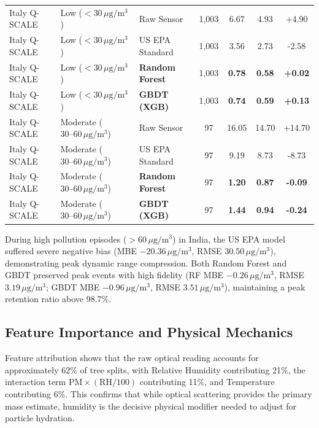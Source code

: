 \documentclass[11pt,a4paper]{article}
\begin{document}
\begin{table}[htbp]
\begin{tabularx}{\textwidth}{l l l c c c c}
\midrule
Italy Q-SCALE & Low ($<30\,\mu\text{g}/\text{m}^3$) & Raw Sensor & 1,003 & 6.67 & 4.93 & +4.90 \\
Italy Q-SCALE & Low ($<30\,\mu\text{g}/\text{m}^3$) & US EPA Standard & 1,003 & 3.56 & 2.73 & -2.58 \\
Italy Q-SCALE & Low ($<30\,\mu\text{g}/\text{m}^3$) & \textbf{Random Forest} & 1,003 & \textbf{0.78} & \textbf{0.58} & \textbf{+0.02} \\
Italy Q-SCALE & Low ($<30\,\mu\text{g}/\text{m}^3$) & \textbf{GBDT (XGB)} & 1,003 & \textbf{0.74} & \textbf{0.59} & \textbf{+0.13} \\
\midrule
Italy Q-SCALE & Moderate ($30\text{--}60\,\mu\text{g}/\text{m}^3$) & Raw Sensor & 97 & 16.05 & 14.70 & +14.70 \\
Italy Q-SCALE & Moderate ($30\text{--}60\,\mu\text{g}/\text{m}^3$) & US EPA Standard & 97 & 9.19 & 8.73 & -8.73 \\
Italy Q-SCALE & Moderate ($30\text{--}60\,\mu\text{g}/\text{m}^3$) & \textbf{Random Forest} & 97 & \textbf{1.20} & \textbf{0.87} & \textbf{-0.09} \\
Italy Q-SCALE & Moderate ($30\text{--}60\,\mu\text{g}/\text{m}^3$) & \textbf{GBDT (XGB)} & 97 & \textbf{1.44} & \textbf{0.94} & \textbf{-0.24} \\
\bottomrule
\end{tabularx}
\end{table}

During high pollution episodes ($>60\,\mu\text{g}/\text{m}^3$) in India, the US EPA model suffered severe negative bias (MBE $-20.36\,\mu\text{g}/\text{m}^3$, RMSE $30.50\,\mu\text{g}/\text{m}^3$), demonstrating peak dynamic range compression. Both Random Forest and GBDT preserved peak events with high fidelity (RF MBE $-0.26\,\mu\text{g}/\text{m}^3$, RMSE $3.19\,\mu\text{g}/\text{m}^3$; GBDT MBE $-0.96\,\mu\text{g}/\text{m}^3$, RMSE $3.51\,\mu\text{g}/\text{m}^3$), maintaining a peak retention ratio above 98.7\%.

\subsection{Feature Importance and Physical Mechanics}
Feature attribution shows that the raw optical reading accounts for approximately 62\% of tree splits, with Relative Humidity contributing 21\%, the interaction term $\text{PM} \times (\text{RH}/100)$ contributing 11\%, and Temperature contributing 6\%. This confirms that while optical scattering provides the primary mass estimate, humidity is the decisive physical modifier needed to adjust for particle hydration.
\end{document}
